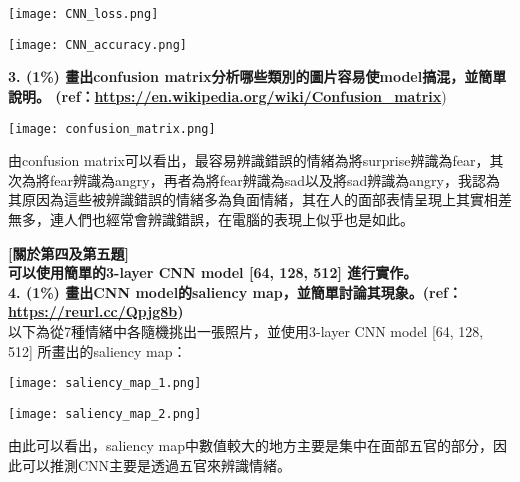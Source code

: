 \documentclass{article}
\begin{document}
\begin{center}
    \texttt{[image: CNN\_loss.png]}\\
\end{center}

\begin{center}
    \texttt{[image: CNN\_accuracy.png]}\\
\end{center}

\noindent
{\bf 3. (1\%) 畫出confusion matrix分析哪些類別的圖片容易使model搞混，並簡單說明。 (ref：\href{https://en.wikipedia.org/wiki/Confusion_matrix}{https://en.wikipedia.org/wiki/Confusion\_matrix}})\\

\begin{center}
    \texttt{[image: confusion\_matrix.png]}\\
\end{center}

由confusion matrix可以看出，最容易辨識錯誤的情緒為將surprise辨識為fear，其次為將fear辨識為angry，再者為將fear辨識為sad以及將sad辨識為angry，我認為其原因為這些被辨識錯誤的情緒多為負面情緒，其在人的面部表情呈現上其實相差無多，連人們也經常會辨識錯誤，在電腦的表現上似乎也是如此。\\

\bigskip

\noindent
{\bf [關於第四及第五題]}\\
{\bf 可以使用簡單的3-layer CNN model [64, 128, 512] 進行實作。}\\

\noindent
{\bf 4. (1\%) 畫出CNN model的saliency map，並簡單討論其現象。(ref：\href{ https://reurl.cc/Qpjg8b}{https://reurl.cc/Qpjg8b})}\\

以下為從7種情緒中各隨機挑出一張照片，並使用3-layer CNN model [64, 128, 512] 所畫出的saliency map：\\

\begin{center}
    \texttt{[image: saliency\_map\_1.png]}
\end{center}

\begin{center}
    \texttt{[image: saliency\_map\_2.png]}\\
\end{center}

由此可以看出，saliency map中數值較大的地方主要是集中在面部五官的部分，因此可以推測CNN主要是透過五官來辨識情緒。\\
\end{document}
